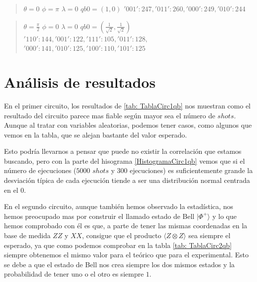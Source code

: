 \documentclass[11pt, a4paper, twocolumn]{article}
\begin{document}
\begin{quote}
	$\theta = 0$ $\phi=\pi$ $\lambda =  0$ \newline
	$qb0 = (1,0)$\newline
 ${'001': 247, '011': 260, '000': 249, '010': 244}$
\end{quote}

\begin{quote}
	$\theta = \frac{\pi}{2}$ $\phi=0$ $\lambda =  0$ \newline
	$qb0 = (\frac{1}{\sqrt{2}},\frac{1}{\sqrt{2}})$\newline
 ${'110': 144, '001': 122, '111': 105, '011': 128,}$ \newline${ '000': 141, '010': 125, '100': 110, '101': 125}$
\end{quote}

\section{Análisis de resultados}

En el primer circuito, los resultados de \ref{tab: TablaCirc1qb} nos muestran 
como el resultado del circuito parece mas fiable según mayor sea el número
de $shots$. Aunque al tratar con variables aleatorias, podemos tener casos, 
como algunos que vemos en la tabla, que se alejan bastante del valor esperado.

\vspace{0.2cm}

Esto podría llevarnos a pensar que puede no existir la correlación que estamos 
buscando, pero con la parte del hisograma \ref{HistogramaCirc1qb} vemos que si el
número de ejecuciones ($5000 $ $shots$ y 300 ejecuciones) es suficientemente grande
la desviación típica  de cada ejecución tiende a ser una distribución normal centrada en
el 0.

\vspace{0.4cm}

En el segundo circuito, aunque también hemos observado la estadística, nos hemos preocupado
mas por construir el llamado estado de Bell $|\Phi^+\rangle$ y lo que hemos comprobado con él
es que, a parte de tener las mismas coordenadas en la base de medida $ZZ$ y $XX$,
consigue que el producto $\langle Z \otimes Z \rangle$ sea siempre el esperado, ya que
como podemos comprobar en la tabla \ref{tab: TablaCirc2qb} siempre obtenemos el mismo
valor para el teórico que para el experimental. Esto se debe a que el estado 
de Bell nos crea siempre los dos mismos estados y la probabilidad de tener uno 
o el otro es siempre $1$.
\end{document}
